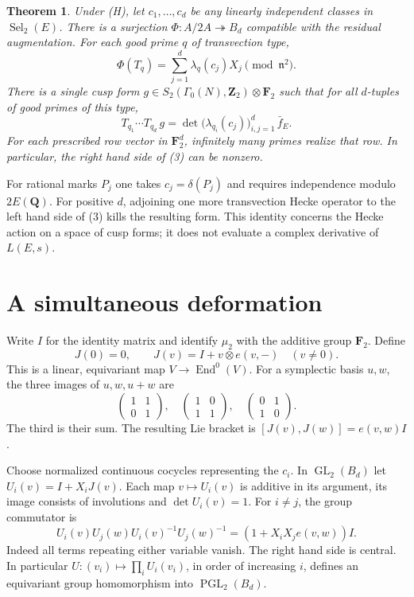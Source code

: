\documentclass[11pt]{article}
\newtheorem{theorem}{Theorem}
\newcommand{\F}{\mathbf F_2}
\newcommand{\Q}{\mathbf Q}
\newcommand{\Z}{\mathbf Z}
\newcommand{\Sel}{\operatorname{Sel}}
\newcommand{\n}{\mathfrak n}
\begin{document}
\begin{theorem}\label{main}
Under \textup{(H)}, let \(c_1,\ldots,c_d\) be any linearly independent classes in \(\Sel_2(E)\). There is a surjection
\(\Phi:A/2A\twoheadrightarrow B_d\) compatible with the residual augmentation. For each good prime \(q\) of transvection type,
\[
 \Phi(T_q)=\sum_{j=1}^d\lambda_q(c_j) X_j\pmod{\n^2}.
\tag{2}
\]
There is a single cusp form \(g\in S_2(\Gamma_0(N),\Z_2)\otimes\F\) such that for all \(d\)-tuples of good primes of this type,
\[
 T_{q_1}\cdots T_{q_d}\,g =
 \det\bigl(\lambda_{q_i}(c_j)\bigr)_{i,j=1}^{d}\,\bar f_E .
\tag{3}
\]
For each prescribed row vector in \(\F^d\), infinitely many primes realize that row. In particular, the right hand side of \textup{(3)} can be nonzero.
\end{theorem}
For rational marks \(P_j\) one takes \(c_j=\delta(P_j)\) and requires independence modulo \(2E(\Q)\). For positive \(d\), adjoining one more transvection Hecke operator to the left hand side of \textup{(3)} kills the resulting form. This identity concerns the Hecke action on a space of cusp forms; it does not evaluate a complex derivative of \(L(E,s)\).

\section{A simultaneous deformation}
Write \(I\) for the identity matrix and identify \(\mu_2\) with the additive group \(\F\). Define
\[
 J(0)=0,\qquad J(v)=I+v\otimes e(v,-)\quad (v\ne0).
\]
This is a linear, equivariant map \(V\to\operatorname{End}^0(V)\). For a symplectic basis \(u,w\), the three images of \(u,w,u+w\) are
\[
 \begin{pmatrix}1&1\\0&1\end{pmatrix},\quad
 \begin{pmatrix}1&0\\1&1\end{pmatrix},\quad
 \begin{pmatrix}0&1\\1&0\end{pmatrix}.
\]
The third is their sum. The resulting Lie bracket is
\([J(v),J(w)]=e(v,w)I\).

Choose normalized continuous cocycles representing the \(c_i\). In \(\operatorname{GL}_2(B_d)\) let \(U_i(v)=I+X_iJ(v)\). Each map \(v\mapsto U_i(v)\) is additive in its argument, its image consists of involutions and \(\det U_i(v)=1\). For \(i\ne j\), the group commutator is
\[
 U_i(v)U_j(w)U_i(v)^{-1}U_j(w)^{-1}
       =(1+X_iX_j e(v,w))I .
\tag{4}
\]
Indeed all terms repeating either variable vanish. The right hand side is central. In particular \(U:(v_i)\mapsto\prod_i U_i(v_i)\), in order of increasing \(i\), defines an equivariant group homomorphism into \(\operatorname{PGL}_2(B_d)\).
\end{document}
